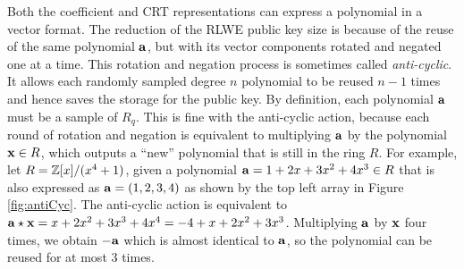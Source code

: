 \documentclass[../main.tex]{subfiles}
\begin{document}

\iffalse
Both the coefficient and CRT representations can express a polynomial in a vector format. The reduction of the RLWE public key size is because of the reuse of the same polynomial $\mathbf{a}$, but with its vector components rotated and negated one at a time. This rotation and negation process is sometimes called \textit{anti-cyclic}. It allows each randomly sampled degree $n$ polynomial to be reused $n-1$ times and hence saves the storage for the public key. 
By definition, each polynomial $\mathbf{a}$ must be a sample of $R_q$. This is fine with the anti-cyclic action, because
each round of rotation and negation is equivalent to multiplying $\mathbf{a}$ by the polynomial $\mathbf{x} \in R$, which outputs a ``new'' polynomial that is still in the ring $R$. For example, let $R=\mathbb{Z}[x]/(x^4+1)$, given a polynomial $\mathbf{a} = 1+2x+3x^2+4x^3 \in R$ that is also expressed as $\mathbf{a}=(1,2,3,4)$ as shown by the top left array in Figure \ref{fig:antiCyc}. The anti-cyclic action is equivalent to $\mathbf{a} \star \mathbf{x} = x+2x^2+3x^3+4x^4=-4+x+2x^2+3x^3$. Multiplying $\mathbf{a}$ by $\mathbf{x}$ four times, we obtain $-\mathbf{a}$ which is almost identical to $\mathbf{a}$, so the polynomial can be reused for at most 3 times. 
\end{document}
